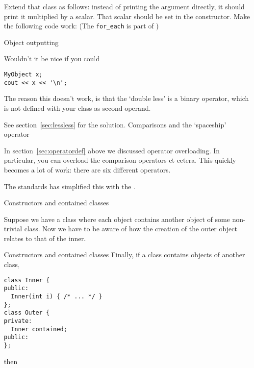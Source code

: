 \begin{exercise}
  \label{ex:functor2}
  Extend that class as follows: instead of printing the argument
  directly, it should print it multiplied by a scalar. That scalar
  should be set in the constructor. Make the following code work:
  (The \lstinline{for_each} is part of )
\end{exercise}


 {Object outputting}
\label{sec:cout-object}

Wouldn't it be nice if you could
\begin{lstlisting}
MyObject x;
cout << x << '\n';
\end{lstlisting}
The reason this doesn't work, is that the `double less'
is a binary operator, which is not defined
with your class as second operand.

See section~\ref{sec:lessless} for the solution.
 {Comparisons and the `spaceship' operator}

In section~\ref{sec:operatordef} above we discussed operator overloading.
In particular, you can overload the comparison operators \n{<,=,>} et cetera.
This quickly becomes a lot of work: there are six different operators.

The  standards has simplified this with
the .


 {Constructors and contained classes}

Suppose we have a class where each object contains
another object of some non-trivial class.
Now we have to be aware of how the creation of the
outer object relates to that of the inner.

\begin{block}{Constructors and contained classes}
  \label{sl:construct-contained1}
Finally, if a class contains objects of another class,
\begin{lstlisting}
class Inner {
public:
  Inner(int i) { /* ... */ }
};
class Outer {
private:
  Inner contained;
public:
};
\end{lstlisting}
\end{block}

then

